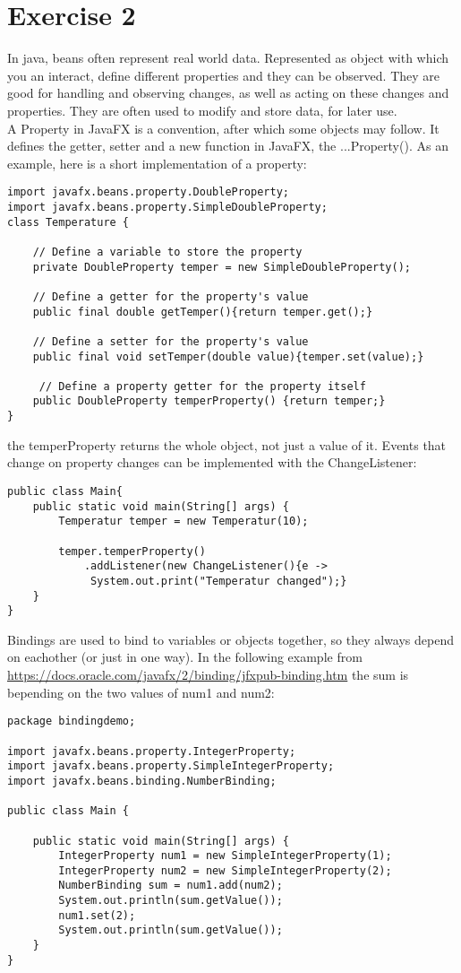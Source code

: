 \documentclass[a4paper, fontsize=12pt]{scrartcl}
\begin{document}
\section*{Exercise 2}
In java, beans often represent real world data. Represented as object with which you an interact, define different properties and they can be observed. They are good for handling and observing changes, as well as acting on these changes and properties. They are often used to modify and store data, for later use.\\
A Property in JavaFX is a convention, after which some objects may follow. It defines the getter, setter and a new function in JavaFX, the ...Property(). As an example, here is a short implementation of a property:
\begin{lstlisting}
import javafx.beans.property.DoubleProperty;
import javafx.beans.property.SimpleDoubleProperty;
class Temperature {
 
    // Define a variable to store the property
    private DoubleProperty temper = new SimpleDoubleProperty();
 
    // Define a getter for the property's value
    public final double getTemper(){return temper.get();}
 
    // Define a setter for the property's value
    public final void setTemper(double value){temper.set(value);}
 
     // Define a property getter for the property itself
    public DoubleProperty temperProperty() {return temper;}
}
\end{lstlisting}
the temperProperty returns the whole object, not just a value of it.
Events that change on property changes can be implemented with the ChangeListener:
\begin{lstlisting}
public class Main{
	public static void main(String[] args) {
		Temperatur temper = new Temperatur(10);
		
		temper.temperProperty()
			.addListener(new ChangeListener(){e ->
			 System.out.print("Temperatur changed");}
	}
}

\end{lstlisting}
 
Bindings are used to bind to variables or objects together, so they always depend on eachother (or just in one way). In the following example from \url{https://docs.oracle.com/javafx/2/binding/jfxpub-binding.htm} the sum is bepending on the two values of num1 and num2:
 \begin{lstlisting}
package bindingdemo;
 
import javafx.beans.property.IntegerProperty;
import javafx.beans.property.SimpleIntegerProperty;
import javafx.beans.binding.NumberBinding;
 
public class Main {
 
    public static void main(String[] args) {
        IntegerProperty num1 = new SimpleIntegerProperty(1);
        IntegerProperty num2 = new SimpleIntegerProperty(2);
        NumberBinding sum = num1.add(num2);
        System.out.println(sum.getValue());
        num1.set(2);
        System.out.println(sum.getValue());
    }
}
\end{lstlisting}
\end{document}
